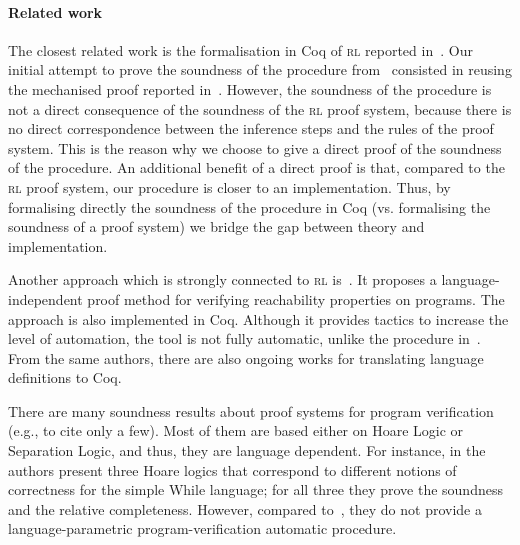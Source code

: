 \documentclass[conference]{IEEEtran}
\newenvironment{todo}{\medskip\hrule\smallskip\noindent}{\smallskip\hrule\medskip}
\renewcommand{\aa}[1]{\begin{todo}\textcolor{OliveGreen}{Andrei:}\\ \color{OliveGreen}{#1}\color{black}\end{todo}}
\renewcommand{\aa}[1]{}
\newcommand{\RL}{\textsc{rl}\xspace}
\begin{document}
\paragraph{Related work} 

The closest related work is the formalisation in Coq of \RL reported in~\cite{stefanescu-ciobaca-mereuta-moore-serbanuta-rosu-2014-rta}.
Our initial attempt to prove the soundness of the procedure from~\cite{lucanu-rusu-arusoaie-nowak-LRC2015} consisted in reusing the mechanised proof reported in~\cite{stefanescu-ciobaca-mereuta-moore-serbanuta-rosu-2014-rta}. 
However, the soundness of the procedure is not a direct consequence of the soundness of the \RL proof system, because there is no direct correspondence between the inference steps and the rules of the proof system.
This is the reason why we choose to give a direct proof of the soundness of the procedure.
An additional benefit of a direct proof is that, compared to the \RL proof system, our procedure is closer to an implementation.
Thus, by formalising directly the soundness of the procedure in Coq (vs. formalising the soundness of a proof system) we bridge the gap between theory and implementation.

Another approach which is strongly connected to \RL is~\cite{moore-rosu-2015-tr}.
It proposes a language-independent proof method for verifying reachability properties on programs.
The approach is also implemented in Coq. 
Although it provides tactics to increase the level of automation, the tool is not fully automatic, unlike the procedure in~\cite{lucanu-rusu-arusoaie-nowak-LRC2015}. 
From the same authors, there are also ongoing works for translating \K language definitions to Coq.



There are many soundness results about proof systems for program verification (e.g., \cite{Marti:2006:FVH:2105385.2105412, Appel:2014:PLC:2670099, weber04towards, Tuch_Klein_05, schirmer} to cite only a few).
Most of them are based either on Hoare Logic or Separation Logic, and thus, they are language dependent.
For instance, in \cite{weber04towards} the authors present three Hoare logics that correspond to different notions of correctness for the simple While language; for all three they prove the soundness and the relative completeness.
However, compared to~\cite{lucanu-rusu-arusoaie-nowak-LRC2015}, they do not provide a language-parametric program-verification automatic procedure.
\end{document}
